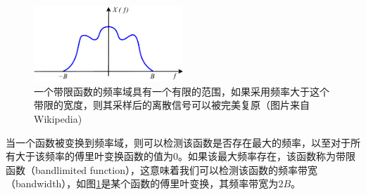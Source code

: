 

\begin{figure}
\sidecaption
	\includegraphics[width=0.5\textwidth]{figures/intro/Bandlimited}
	\caption{一个带限函数的频率域具有一个有限的范围，如果采用频率大于这个带限的宽度，则其采样后的离散信号可以被完美复原（图片来自Wikipedia)}
	\label{f:intro-fourier-case}
\end{figure}

当一个函数被变换到频率域，则可以检测该函数是否存在最大的频率，以至对于所有大于该频率的傅里叶变换函数的值为$0$。如果该最大频率存在，该函数称为带限函数（bandlimited function），这意味着我们可以检测该函数的频率带宽（bandwidth），如图\ref{f:intro-fourier-case}是某个函数的傅里叶变换，其频率带宽为$2B$。

